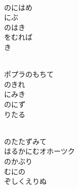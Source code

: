 \documentclass[10pt,b5j]{tarticle} %
\begin{document}
\vspace{1.5em} %
\newcommand{\linespace}{0.5em} %
\newcommand{\blocksize}{0.5\hsize} %
\newcommand{\itemmargin}{3em} %
\begin{enumerate} %
    \setlength{\itemindent}{\itemmargin} %
    \begin{minipage}[c]{\blocksize}
    
        \vspace{\linespace}
        \item~\\
        のにはめ\\
        にぶ\\
        のはき\\
        をむれば\\
        き
        
    \end{minipage}
    \begin{minipage}[c]{\blocksize}
        
        \vspace{\linespace}
        \item~\\
        ポプラのもちて\\
        のきれ\\
        にみき\\
        のにず\\
        りたる
        
    \end{minipage}
    \begin{minipage}[c]{\blocksize}
        
        \vspace{\linespace}
        \item~\\
        のたたずみて\\
        はるかにむオホーツク\\
        のかぶり\\
        むにの\\
        ぞしくえりぬ
        

\end{minipage}
\end{enumerate}
\end{document}
